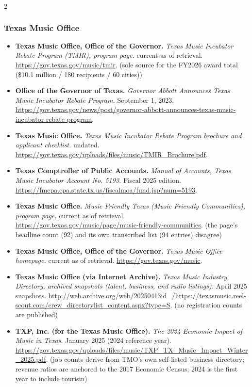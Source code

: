 {\begin{multicols}{2}
\subsubsection*{Texas Music Office}
\begin{itemize}[itemsep=0pt,topsep=1pt,parsep=0pt,partopsep=0pt,leftmargin=1em]
\item \textbf{Texas Music Office, Office of the Governor.} \textit{Texas Music Incubator Rebate Program (TMIR), program page.} current as of retrieval. \url{https://gov.texas.gov/music/tmir}. {\color{ammuted}(sole source for the FY2026 award total (\$10.1 million / 180 recipients / 60 cities))}
\item \textbf{Office of the Governor of Texas.} \textit{Governor Abbott Announces Texas Music Incubator Rebate Program.} September 1, 2023. \url{https://gov.texas.gov/news/post/governor-abbott-announces-texas-music-incubator-rebate-program}.
\item \textbf{Texas Music Office.} \textit{Texas Music Incubator Rebate Program brochure and applicant checklist.} undated. \url{https://gov.texas.gov/uploads/files/music/TMIR_Brochure.pdf}.
\item \textbf{Texas Comptroller of Public Accounts.} \textit{Manual of Accounts, Texas Music Incubator Account No. 5193.} Fiscal 2025 edition. \url{https://fmcpa.cpa.state.tx.us/fiscalmoa/fund.jsp?num=5193}.
\item \textbf{Texas Music Office.} \textit{Music Friendly Texas (Music Friendly Communities), program page.} current as of retrieval. \url{https://gov.texas.gov/music/page/music-friendly-communities}. {\color{ammuted}(the page’s headline count (92) and its own transcribed list (94 entries) disagree)}
\item \textbf{Texas Music Office, Office of the Governor.} \textit{Texas Music Office homepage.} current as of retrieval. \url{https://gov.texas.gov/music}.
\item \textbf{Texas Music Office (via Internet Archive).} \textit{Texas Music Industry Directory, archived snapshots (talent, business, and radio listings).} April 2025 snapshots. \url{http://web.archive.org/web/20250413id_/https://texasmusic.reel-scout.com/crew_directorylist_content.aspx?type=S}. {\color{ammuted}(no registration counts are published)}
\item \textbf{TXP, Inc. (for the Texas Music Office).} \textit{The 2024 Economic Impact of Music in Texas.} January 2025 (2024 reference year). \url{https://gov.texas.gov/uploads/files/music/TXP_TX_Music_Impact_Winter_2025.pdf}. {\color{ammuted}(job counts derive from TMO’s own self-listed business directory; revenue ratios are anchored to the 2017 Economic Census; 2024 is the first year to include tourism)}

\end{itemize}
\end{multicols}}
